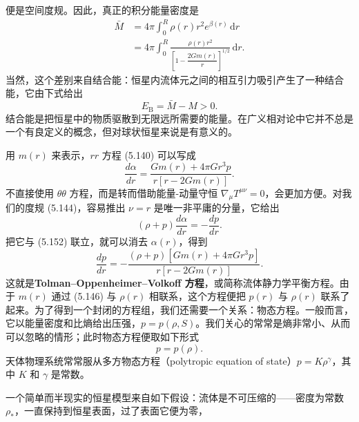 便是空间度规。因此，真正的积分能量密度是
\begin{align*}
\bar{M} &= 4\pi\int_0^R \rho(r)r^2 e^{\beta(r)}\,\mathrm{d}r\\
&= 4\pi\int_0^R \frac{\rho(r)r^2}{\left[1 - \dfrac{2Gm(r)}{r}\right]^{1/2}}\,\mathrm{d}r.
\tag{5.150}
\end{align*}
当然，这个差别来自结合能：恒星内流体元之间的相互引力吸引产生了一种结合能，它由下式给出
\begin{equation*}
E_{\mathrm{B}} = \bar{M} - M > 0.
\tag{5.151}
\end{equation*}
结合能是把恒星中的物质驱散到无限远所需要的能量。在广义相对论中它并不总是一个有良定义的概念，但对球状恒星来说是有意义的。

用 $m(r)$ 来表示，$rr$ 方程 (5.140) 可以写成
\begin{equation*}
\frac{d\alpha}{dr} = \frac{Gm(r) + 4\pi G r^3 p}{r\left[r - 2Gm(r)\right]}.
\tag{5.152}
\end{equation*}
不直接使用 $\theta\theta$ 方程，而是转而借助能量-动量守恒 $\nabla_\mu T^{\mu\nu} = 0$，会更加方便。对我们的度规 (5.144)，容易推出 $\nu = r$ 是唯一非平庸的分量，它给出
\begin{equation*}
(\rho + p)\frac{d\alpha}{dr} = -\frac{dp}{dr}.
\tag{5.153}
\end{equation*}
把它与 (5.152) 联立，就可以消去 $\alpha(r)$，得到
\begin{equation*}
\frac{dp}{dr} = -\frac{(\rho + p)\left[Gm(r) + 4\pi G r^3 p\right]}{r\left[r - 2Gm(r)\right]}.
\tag{5.154}
\end{equation*}
这就是\textbf{Tolman--Oppenheimer--Volkoff 方程}，或简称流体静力学平衡方程。由于 $m(r)$ 通过 (5.146) 与 $\rho(r)$ 相联系，这个方程便把 $p(r)$ 与 $\rho(r)$ 联系了起来。为了得到一个封闭的方程组，我们还需要一个关系：物态方程。一般而言，它以能量密度和比熵给出压强，$p = p(\rho, S)$。我们关心的常常是熵非常小、从而可以忽略的情形；此时物态方程便取如下形式
\begin{equation*}
p = p(\rho).
\tag{5.155}
\end{equation*}
天体物理系统常常服从多方物态方程（polytropic equation of state）$p = K\rho^{\gamma}$，其中 $K$ 和 $\gamma$ 是常数。

一个简单而半现实的恒星模型来自如下假设：流体是不可压缩的——密度为常数 $\rho_*$，一直保持到恒星表面，过了表面它便为零，

